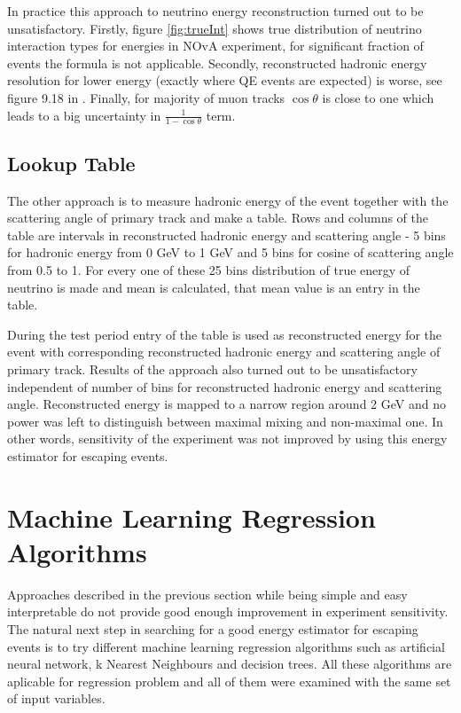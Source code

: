 In practice this approach to neutrino energy reconstruction turned out to be unsatisfactory.
Firstly, figure \ref{fig:trueInt} shows true distribution of neutrino interaction types for
energies in NOvA experiment, for significant fraction of events the formula is not applicable. 
Secondly, reconstructed hadronic energy resolution for lower energy (exactly where QE
events are expected) is worse, see figure 9.18 in \cite{Susan}. Finally, for majority
of muon tracks $\cos\theta$ is close to one which leads to a big uncertainty in 
$\frac{1}{1-\cos\theta}$ term.

\subsection{Lookup Table}
The other approach is to measure hadronic energy of the event together with the scattering
angle of primary track and make a table. Rows and columns of the table are intervals in
reconstructed hadronic energy and scattering angle - 5 bins for hadronic energy from 0 GeV 
to 1 GeV and 5 bins for cosine of scattering angle from 0.5 to 1. For every one of these 25
bins distribution of true energy of neutrino is made and mean is calculated, that mean value
is an entry in the table.

During the test period entry of the table is used as reconstructed energy for the event
with corresponding reconstructed hadronic energy and scattering angle of primary track. 
Results of the approach also turned out to be unsatisfactory independent of number of bins
for reconstructed hadronic energy and scattering angle. Reconstructed energy is mapped to
a narrow region around 2 GeV and no power was left to distinguish between maximal mixing and
non-maximal one. In other words, sensitivity of the experiment was not improved by using 
this energy estimator for escaping events.

\section{Machine Learning Regression Algorithms}
Approaches described in the previous section while being simple and easy interpretable do
not provide good enough improvement in experiment sensitivity. The natural next step in
searching for a good energy estimator for escaping events is to try different machine 
learning regression algorithms such as artificial neural network, k Nearest Neighbours and
decision trees. All these algorithms are aplicable for regression problem and all of them 
were examined with the same set of input variables.

